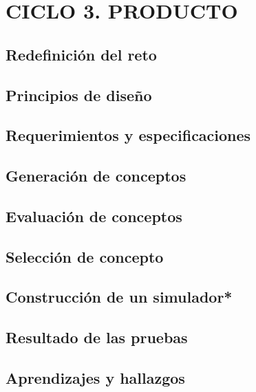 \chapter{CICLO 3. PRODUCTO}
\section{Redefinición del reto}
\section{Principios de diseño}
\section{Requerimientos y especificaciones}
\section{Generación de conceptos}
\section{Evaluación de conceptos}
\section{Selección de concepto}
\section{Construcción de un simulador*}
\section{Resultado de las pruebas}
\section{Aprendizajes y hallazgos}
